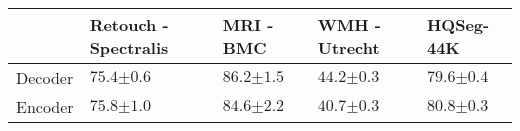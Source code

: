 \begin{table}[]
\centering
\begin{tabular}{@{}lP{2.1cm}P{2cm}P{2.1cm}P{2cm}@{}}
\toprule
 & Retouch - Spectralis & MRI - BMC & WMH - Utrecht & HQSeg-44K  \\ \midrule
Decoder & $75.4{\scriptstyle \pm 0.6}$ & $\mathbf{86.2}{\scriptstyle \pm 1.5}$ & $\mathbf{44.2}{\scriptstyle \pm 0.3}$ & $79.6{\scriptstyle \pm 0.4}$ \\
Encoder & $\mathbf{75.8}{\scriptstyle \pm 1.0}$ & $84.6{\scriptstyle \pm 2.2}$ & $40.7{\scriptstyle \pm 0.3}$ & $\mathbf{80.8}{\scriptstyle \pm 0.3}$ \\ \bottomrule 
\end{tabular}
\end{table}